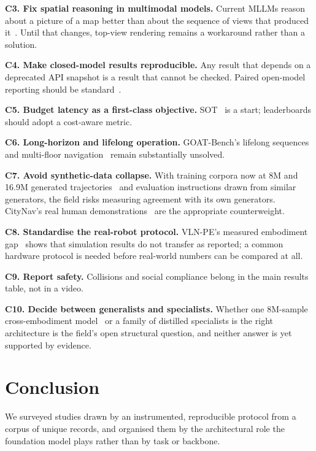 \documentclass[journal]{IEEEtran}
\begin{document}
\textbf{C3. Fix spatial reasoning in multimodal models.} Current MLLMs
reason about a picture of a map better than about the sequence of views that
produced it~\cite{zhong2026topv}. Until that changes, top-view rendering
remains a workaround rather than a solution.

\textbf{C4. Make closed-model results reproducible.} Any result that depends
on a deprecated API snapshot is a result that cannot be checked. Paired
open-model reporting should be standard~\cite{qiao2025open}.

\textbf{C5. Budget latency as a first-class objective.} SOT~\cite{wang2026hydra}
is a start; leaderboards should adopt a cost-aware metric.

\textbf{C6. Long-horizon and lifelong operation.} GOAT-Bench's lifelong
sequences~\cite{khanna2024goat} and multi-floor
navigation~\cite{gong2026stairway,zhang2025multi,werby2024hierarchical}
remain substantially unsolved.

\textbf{C7. Avoid synthetic-data collapse.} With training corpora now at 8M
and 16.9M generated
trajectories~\cite{zhang2025embodied,chu2026abot} and evaluation
instructions drawn from similar generators, the field risks measuring
agreement with its own generators. CityNav's real human
demonstrations~\cite{lee2024citynav} are the appropriate counterweight.

\textbf{C8. Standardise the real-robot protocol.} VLN-PE's measured
embodiment gap~\cite{wang2025rethinking} shows that simulation results do
not transfer as reported; a common hardware protocol is needed before
real-world numbers can be compared at all.

\textbf{C9. Report safety.} Collisions and social compliance belong in the
main results table, not in a video.

\textbf{C10. Decide between generalists and specialists.} Whether one
8M-sample cross-embodiment model~\cite{zhang2025embodied} or a family of
distilled specialists is the right architecture is the field's open
structural question, and neither answer is yet supported by evidence.

\section{Conclusion}\label{sec:conclusion}
We surveyed \ReadTotal{} studies drawn by an instrumented, reproducible
protocol from a corpus of \CorpusDedup{} unique records, and organised them
by the architectural role the foundation model plays rather than by task or
backbone.
\end{document}

